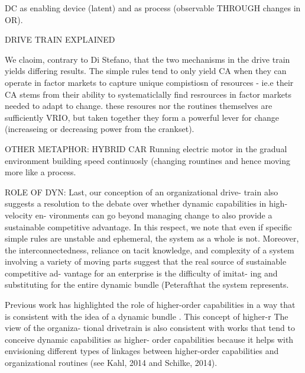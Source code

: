 DC as enabling device (latent) and as process (observable THROUGH changes in OR). 




DRIVE TRAIN EXPLAINED



We claoim, contrary to Di Stefano, that the two mechanisms in the drive train yields
differing results. The simple rules tend to only yield CA when they can operate in factor
markets to capture unique compistiosn of resources - ie.e their CA stems from their
ability to systematiclally find resrources in factor markets needed to adapt to
change. these resoures nor the routines themselves are sufficiently VRIO, but taken
together they form a powerful lever for change (increaseing or decreasing power from the
crankset).



OTHER METAPHOR: HYBRID CAR
Running electric motor in the gradual environment building speed continuosly (changing
rountines and hence moving more like a process.


ROLE OF DYN:
Last, our conception of an organizational drive-
train also suggests a resolution to the debate over whether dynamic capabilities in high-velocity en- vironments can go beyond managing change to also provide a sustainable competitive advantage. In this respect, we note that even if specific simple rules are unstable and ephemeral, the system as a whole is not. Moreover, the interconnectedness, reliance on tacit knowledge, and complexity of a system involving a variety of moving parts suggest that the real source of sustainable competitive ad- vantage for an enterprise is the difficulty of imitat- ing and substituting for the entire dynamic bundle (Peterafthat the system represents.


Previous work has highlighted the role of higher-order capabilities in a way that is
consistent with the idea of a dynamic bundle \citep{Schilke2014a}. This concept of higher-r
The view of the organiza- tional drivetrain is also consistent with works that tend to conceive dynamic capabilities as higher- order capabilities because it helps with envisioning different types of linkages between higher-order capabilities and organizational routines (see Kahl, 2014 and Schilke, 2014).
